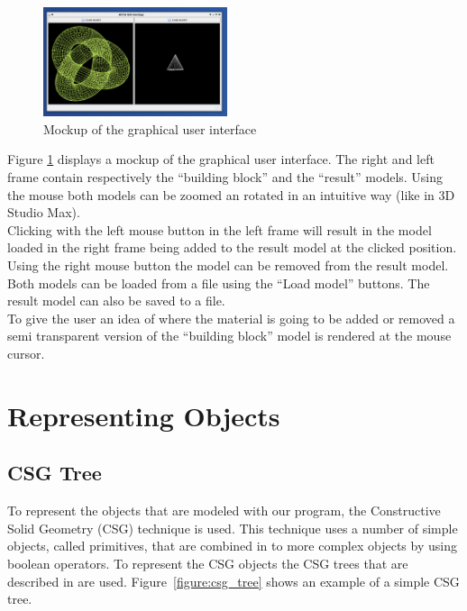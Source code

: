 \documentclass[a4paper,10pt,twocolumn]{article}
\begin{document}
\begin{figure}[h]
\centering
\includegraphics[width = 0.48\textwidth]{../resources/gui_mockup/1}
\caption{Mockup of the graphical user interface} \label{gui_mockup}
\end{figure}

Figure \ref{gui_mockup} displays a mockup of the graphical user interface. The right and left frame contain respectively the ``building block'' and the ``result'' models. Using the mouse both models can be zoomed an rotated in an intuitive way (like in 3D Studio Max).\\

Clicking with the left mouse button in the left frame will result in the model loaded in the right frame being added to the result model at the clicked position. Using the right mouse button the model can be removed from the result model. \\

Both models can be loaded from a file using the ``Load model'' buttons. The result model can also be saved to a file. \\

To give the user an idea of where the material is going to be added or removed a semi transparent version of the ``building block'' model is rendered at the mouse cursor.\\
\nopagebreak
\section{Representing Objects}
\label{chapt:repobj}

\subsection{CSG Tree}
    To represent the objects that are modeled with our program, the Constructive Solid Geometry (CSG) technique is used. This technique uses a number of simple objects, called primitives, that are combined in to more complex objects by using boolean operators. To represent the CSG objects the CSG trees that are described in \cite{Wiegand96} are used. Figure~\ref{figure:csg_tree} shows an example of a simple CSG tree.\\
\end{document}
